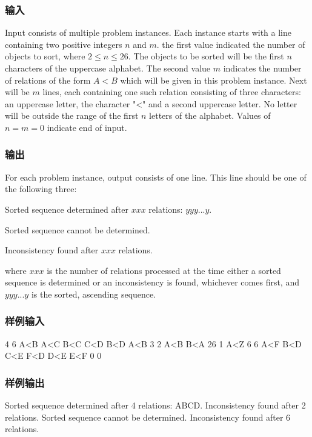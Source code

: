 \subsubsection{输入}
Input consists of multiple problem instances. Each instance starts with a line containing two positive integers $n$ and $m$. the first value indicated the number of objects to sort, where $2 \leq n \leq 26$. The objects to be sorted will be the first $n$ characters of the uppercase alphabet. The second value $m$ indicates the number of relations of the form $A < B$ which will be given in this problem instance. Next will be $m$ lines, each containing one such relation consisting of three characters: an uppercase letter, the character "<" and a second uppercase letter. No letter will be outside the range of the first $n$ letters of the alphabet. Values of $n = m = 0$ indicate end of input.

\subsubsection{输出}
For each problem instance, output consists of one line. This line should be one of the following three: 

Sorted sequence determined after $xxx$ relations: $yyy...y$.

Sorted sequence cannot be determined. 

Inconsistency found after $xxx$ relations.

where $xxx$ is the number of relations processed at the time either a sorted sequence is determined or an inconsistency is found, whichever comes first, and $yyy...y$ is the sorted, ascending sequence.

\subsubsection{样例输入}
\begin{Code}
4 6
A<B
A<C
B<C
C<D
B<D
A<B
3 2
A<B
B<A
26 1
A<Z
6 6
A<F
B<D
C<E
F<D
D<E
E<F
0 0
\end{Code}

\subsubsection{样例输出}
\begin{Code}
Sorted sequence determined after 4 relations: ABCD.
Inconsistency found after 2 relations.
Sorted sequence cannot be determined.
Inconsistency found after 6 relations.
\end{Code}

